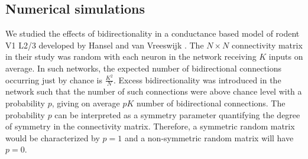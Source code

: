 \subsection{Numerical simulations}
We studied the effects of bidirectionality in a conductance based model of rodent V1 L2/3 developed by Hansel and van Vreeswijk \cite{Hansel2012}. 
The $N \times N$ connectivity matrix in their study was random with each neuron in the network receiving $K$ inputs on average. In such networks, the expected number of bidirectional connections occurring just by chance is $\frac{K^2}{N}$. Excess bidirectionality was introduced in the network such that the number of such connections were above chance level with a probability $p$, giving on average $pK$ number of bidirectional connections. The probability $p$ can be interpreted as a symmetry parameter quantifying the degree of symmetry in the connectivity matrix. Therefore, a symmetric random matrix would be characterized by $p = 1$ and a non-symmetric random matrix will have $p = 0$. %
